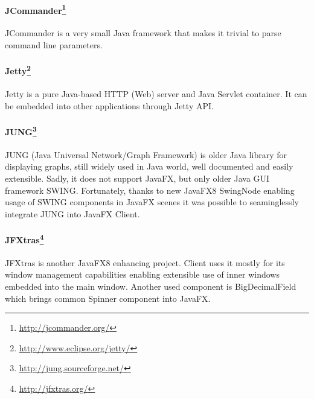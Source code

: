 


\paragraph{JCommander\footnote{\url{http://jcommander.org/}}}
JCommander is a very small Java framework that makes it trivial to parse command
line parameters.

\paragraph{Jetty\footnote{\url{http://www.eclipse.org/jetty/}}}
Jetty is a pure Java-based HTTP (Web) server and Java Servlet container. It can
be embedded into other applications through Jetty API.

\paragraph{JUNG\footnote{\url{http://jung.sourceforge.net/}}}
JUNG (Java Universal Network/Graph Framework) is older Java library for
displaying graphs, still widely used in Java world, well documented and easily
extensible. Sadly, it does not support JavaFX, but only older Java GUI framework
SWING. Fortunately, thanks to new JavaFX8 SwingNode enabling usage of SWING
components in JavaFX scenes it was possible to seaminglessly integrate JUNG into
JavaFX \textan{} Client.

\paragraph{JFXtras\footnote{\url{http://jfxtras.org/}}}
JFXtras is another JavaFX8 enhancing project. \textan{} Client uses it mostly for
its window management capabilities enabling extensible use of inner windows
embedded into the main window. Another used component is BigDecimalField which
brings common Spinner component into JavaFX.

